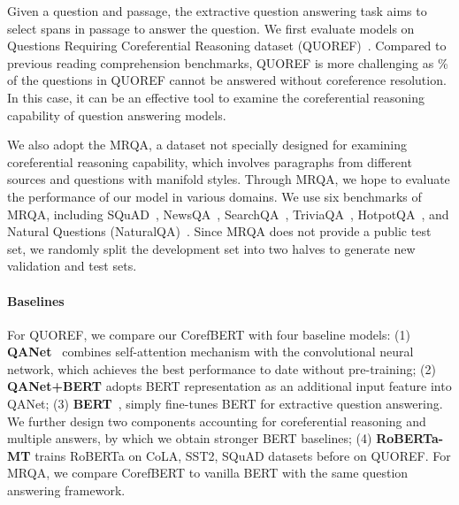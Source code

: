 \documentclass[11pt,a4paper]{article}
\begin{document}
Given a question and passage, the extractive question answering task aims to select spans in passage to answer the question. We first evaluate models on  Questions Requiring Coreferential Reasoning dataset (QUOREF)~\citep{QUOREF}.
Compared to previous reading comprehension benchmarks, QUOREF is more challenging as \% of the questions in QUOREF cannot be answered without coreference resolution. In  this case, it can be an effective tool to examine the coreferential reasoning capability of question answering models. 


We also adopt the MRQA, a dataset not specially designed for examining  coreferential reasoning capability, which involves paragraphs from different sources and questions with manifold styles. Through MRQA, we hope to evaluate the performance of our model in various domains.
We use six benchmarks of MRQA, including SQuAD~\citep{rajpurkar2016squad}, NewsQA~\citep{newsqa}, SearchQA~\citep{searchqa}, TriviaQA~\citep{triviaqa}, HotpotQA~\citep{hotpotqa}, and Natural Questions (NaturalQA)~\citep{naturalqa}. Since MRQA does not provide a public test set, we randomly split the development set into two halves to generate new validation and test sets.



\vspace{-0.1em}
\paragraph{Baselines} For QUOREF, we compare our CorefBERT  with four baseline models: (1) \textbf{QANet}~\citep{QANET} combines self-attention mechanism with the convolutional neural network, which achieves the best performance to date without pre-training; (2) \textbf{QANet+BERT} adopts BERT representation as an additional input feature into QANet; (3) \textbf{BERT}~\citep{BERT}, simply fine-tunes BERT for extractive question answering.   We further design two components accounting for coreferential reasoning and multiple answers, by which we obtain stronger BERT baselines;
(4) \textbf{RoBERTa-MT}  trains RoBERTa on CoLA, SST2, SQuAD datasets before on QUOREF. For MRQA, we compare CorefBERT to vanilla BERT with the same question answering framework.
\end{document}
